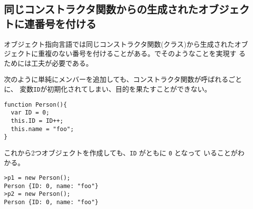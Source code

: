 \subsection{同じコンストラクタ関数からの生成されたオブジェクトに連番号を付ける}\label{SetID}
オブジェクト指向言語では同じコンストラクタ関数(クラス)から生成されたオブ
ジェクトに重複のない番号を付けることがある。\JS でそのようなことを実現す
るためには工夫が必要である。

次のように単純にメンバーを追加しても、コンストラクタ関数が呼ばれるごとに、
変数\texttt{ID}が初期化されてしまい、目的を果たすことができない。
\begin{Verbatim}
function Person(){
  var ID = 0;
  this.ID = ID++;
  this.name = "foo";
}
\end{Verbatim}
これから2つオブジェクトを作成しても、\texttt{ID} がともに \texttt{0} となって
いることがわかる。
\begin{Verbatim}
>p1 = new Person();
Person {ID: 0, name: "foo"}
>p2 = new Person();
Person {ID: 0, name: "foo"}
\end{Verbatim}

